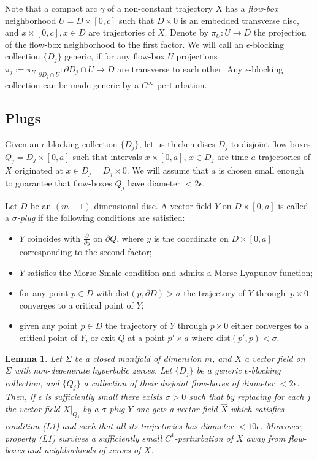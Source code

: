 \documentclass[12pt]{amsart}
\theoremstyle{plain}
\newtheorem{lemma}[theorem]{Lemma}
\theoremstyle{definition}
\theoremstyle{remark}
\newcommand{\eps}{\epsilon}
\newcommand{\p}{\partial}
\newcommand{\wh}{\widehat}
\newcommand{\dist}{\mathrm{dist}}
\begin{document}
   Note that a compact arc $\gamma$ of a non-constant trajectory $X$ has a {\em flow-box} neighborhood  $U=D\times [0,c]$ such that $D\times 0$ is an embedded transverse disc, and $x\times[0,c], x\in D$ are trajectories of $X$. Denote by $\pi_U:U\to D$ the projection of the flow-box neighborhood to the first factor.
   We will call an  $\eps$-blocking collection $\{D_j\}$ generic, if for any flow-box $U$  projections  $ \pi_j := \pi_U|_{ \p D_j\cap U}:\p D_j\cap U\to D$ are transverse to each other.  Any $\eps$-blocking collection can be made generic by a $C^\infty$-perturbation.

   \subsection{Plugs}\label{sec:plug}  
  
  
Given an $\eps$-blocking collection  $  \{D_j\}$,  let us thicken  discs $D_j$ to disjoint   flow-boxes  $Q_j=D_j\times[0,a]$ such that    intervals $x\times[0,a]$, $x\in D_j $  are  time $a$  trajectories of $X$ originated at $x\in D_j=D_j\times 0$. We will assume that $a$ is chosen small enough to guarantee that flow-boxes $Q_j$ have diameter $<2\eps$. 

Let $D$ be an $(m-1)$-dimensional disc. A vector field $Y$  on $D\times[0,a]$ is called 
a  {\em $\sigma$-plug}  if the following conditions are satisfied:
\begin{itemize}
\item[P1.] $Y$ coincides with $\frac{\p}{\p y}$ on $ \p Q$, where $y$ is the coordinate on $D\times[0,a]$ corresponding to the second factor;
\item[P2.] $Y$ satisfies the Morse-Smale condition and  admits a Morse Lyapunov function;  
\item[P3.] for  any point $p\in D$   with $\dist (p,\p D)>\sigma$ the  trajectory of $Y$    through     $\ p\times 0$ converges  to a critical point of $Y$;\item[P4.] given any  point $p\in D$  the  trajectory of $Y$    through    $p\times 0 $  either converges  to a critical point of $Y$, or exit $Q$ at a point $ p'\times a   $ where $\dist (   p', p)<\sigma$.
\end{itemize}
\begin{lemma}\label{lm:sigma-plug}
Let   $\Sigma$ be a closed  manifold of dimension $m$, and    $X$    a  vector field on $\Sigma$ with non-degenerate hyperbolic zeroes.  
Let $\{D_j\}$ be  a  generic  $\eps$-blocking collection,  and 
    $\{Q_j\} $   a collection of their    disjoint flow-boxes  of diameter $ <2\eps$. Then, if $\eps$ is sufficiently small  there exists    $\sigma>0$ such that  by replacing      for each $j$ the vector field $X|_{Q_j}$ by a    $\sigma$-plug $Y$ one gets  a vector field $\wh X$ which satisfies condition (L1) and such that
 all  its trajectories   has diameter $<10\eps$. Moreover,  property (L1) survives a sufficiently small $C^1$-perturbation of  $X$ away from flow-boxes and    neighborhoods of zeroes of $X$. 
 \end{lemma}
\end{document}
